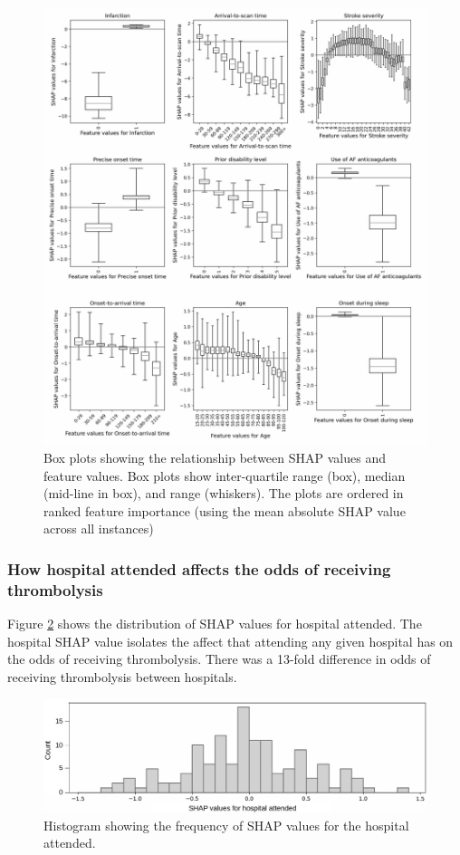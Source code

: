 \begin{figure}[ht!]
    \centering
    \includegraphics[width=1\linewidth]{images/p2_patient_shap.jpg}
    \caption{Box plots showing the relationship between SHAP values and feature values. Box plots show inter-quartile range (box), median (mid-line in box), and range (whiskers). The plots are ordered in ranked feature importance (using the mean absolute SHAP value across all instances)}
    \label{fig:global_shap}
\end{figure}

\subsubsection{How hospital attended affects the odds of receiving thrombolysis}

Figure \ref{fig:hospital_shap} shows the distribution of SHAP values for hospital attended. The hospital SHAP value isolates the affect that attending any given hospital has on the odds of receiving thrombolysis. There was a 13-fold difference in odds of receiving thrombolysis between hospitals.

\begin{figure}
    \centering
    \includegraphics[width=1\linewidth]{images/p2_hosp_shap.jpg}
    \caption{Histogram showing the frequency of SHAP values for the hospital attended.}
    \label{fig:hospital_shap}
\end{figure}

